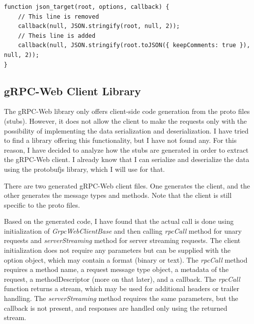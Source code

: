 \begin{lstlisting}[style=JavaScript, caption={protobufjs-cli comments support}, label={lst:protobufjs-comments}]
function json_target(root, options, callback) {
    // This line is removed
    callback(null, JSON.stringify(root, null, 2));
    // Theis line is added
    callback(null, JSON.stringify(root.toJSON({ keepComments: true }), null, 2));
}
\end{lstlisting}

\subsection{gRPC-Web Client Library}\label{subsec:grpc-web-client}
The gRPC-Web library only offers client-side code generation from the proto files (stubs).
However, it does not allow the client to make the requests only with the possibility of implementing the data serialization and deserialization.
I have tried to find a library offering this functionality, but I have not found any.
For this reason, I have decided to analyze how the stubs are generated in order to extract the gRPC-Web client.
I already know that I can serialize and deserialize the data using the protobufjs library, which I will use for that.

There are two generated gRPC-Web client files.
One generates the client, and the other generates the message types and methods.
Note that the client is still specific to the proto files.

Based on the generated code, I have found that the actual call is done using initialization of \textit{GrpcWebClientBase} and then calling \textit{rpcCall} method for unary requests and \textit{serverStreaming} method for server streaming requests.
The client initialization does not require any parameters but can be supplied with the option object, which may contain a format (binary or text).
The \textit{rpcCall} method requires a method name, a request message type object, a metadata of the request, a methodDescriptor (more on that later), and a callback.
The \textit{rpcCall} function returns a stream, which may be used for additional headers or trailer handling.
The \textit{serverStreaming} method requires the same parameters, but the callback is not present, and responses are handled only using the returned stream.

